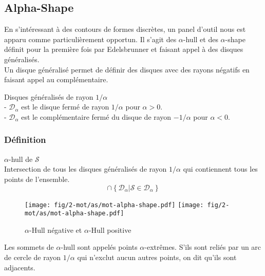 \subsection{Alpha-Shape}

En s'intéressant à des contours de formes discrètes, un panel d'outil nous est apparu comme particulièrement opportun. Il s'agit des $\alpha$-hull et des $\alpha$-shape définit pour la première fois par Edelsbrunner \cite{EdeKirSei83} et faisant appel à des disques généralisés.\\

Un disque généralisé permet de définir des disques avec des rayons négatifs en faisant appel au complémentaire.

\begin{Definition}{Disques généralisés de rayon $1/\alpha$}\\
\label{def:dis-gen}
   \noindent - $\mathcal{D}_{\alpha}$ est le disque fermé de rayon $1/\alpha$ pour $\alpha > 0$.\\
   \noindent - $\mathcal{D}_{\alpha}$ est le complémentaire fermé du disque de rayon $- 1/\alpha$ pour $\alpha < 0$.
\end{Definition}

\subsubsection{Définition}

\begin{Definition}{$\alpha$-hull de $\mathcal{S}$}\\
\label{def:ah-txt}
    Intersection de tous les disques généralisés de rayon $1/\alpha$ qui contiennent tous les points de l'ensemble.
    $$\cap \left\{ \mathcal{D}_{\alpha} | \mathcal{S} \in \mathcal{D}_{\alpha} \right\}$$
\end{Definition}

\begin{figure}[H]
  \centering
  \texttt{[image: fig/2-mot/as/mot-alpha-shape.pdf]}
  \texttt{[image: fig/2-mot/as/mot-alpha-shape.pdf]}
  \caption{$\alpha$-Hull négative et $\alpha$-Hull positive }
\end{figure}
  
Les sommets de $\alpha$-hull sont appelés points $\alpha$-extrêmes. S'ils sont reliés par un arc de cercle de rayon $1/ \alpha$ qui n'exclut aucun autres points, on dit qu'ils sont adjacents.

